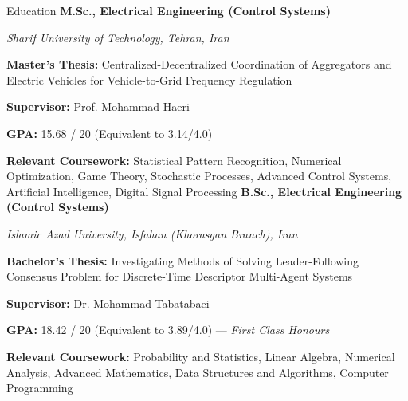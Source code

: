 \begin{rubric}{Education}
\entry*[2017 -- 2019]%
	\textbf{M.Sc., Electrical Engineering (Control Systems)}
	\par \emph{Sharif University of Technology, Tehran, Iran}
    \par \textbf{Master's Thesis:} Centralized-Decentralized Coordination of Aggregators and Electric Vehicles for Vehicle-to-Grid Frequency Regulation
    \par \textbf{Supervisor:} Prof. Mohammad Haeri
    \par \textbf{GPA:} 15.68 / 20 (Equivalent to 3.14/4.0)
    \par \textbf{Relevant Coursework:} Statistical Pattern Recognition, Numerical Optimization, Game Theory, Stochastic Processes, Advanced Control Systems, Artificial Intelligence, Digital Signal Processing
%
\entry*[2014 -- 2017]%
	\textbf{B.Sc., Electrical Engineering (Control Systems)} 
    \par \emph{Islamic Azad University, Isfahan (Khorasgan Branch), Iran}
    \par \textbf{Bachelor's Thesis:} Investigating Methods of Solving Leader-Following Consensus Problem for Discrete-Time Descriptor Multi-Agent Systems
    \par \textbf{Supervisor:} Dr. Mohammad Tabatabaei
    \par \textbf{GPA:} 18.42 / 20 (Equivalent to 3.89/4.0) — \textit{First Class Honours}
    \par \textbf{Relevant Coursework:} Probability and Statistics, Linear Algebra, Numerical Analysis, Advanced Mathematics, Data Structures and Algorithms, Computer Programming
% 
\end{rubric}
